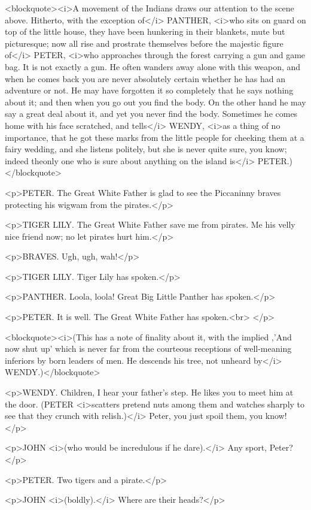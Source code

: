 <blockquote><i>A movement of the Indians draws our attention to the
scene above. Hitherto, with the exception of</i> PANTHER, <i>who sits
on guard on top of the little house, they have been hunkering in
their blankets, mute but picturesque; now all rise and prostrate
themselves before the majestic figure of</i> PETER, <i>who approaches
through the forest carrying a gun and game bag. It is not exactly a
gun. He often wanders away alone with this weapon, and when he comes
back you are never absolutely certain whether he has had an adventure
or not. He may have forgotten it so completely that he says nothing
about it; and then when you go out you find the body. On the other
hand he may say a great deal about it, and yet you never find the
body. Sometimes he comes home with his face scratched, and tells</i>
WENDY, <i>as a thing of no importance, that he got these marks from
the little people for cheeking them at a fairy wedding, and she
listens politely, but she is never quite sure, you know; indeed
theonly one who is sure about anything on the island is</i>
PETER.)</blockquote>

<p>PETER. The Great White Father is glad to see the Piccaninny braves
protecting his wigwam from the pirates.</p>

<p>TIGER LILY. The Great White Father save me from pirates. Me his
velly nice friend now; no let pirates hurt him.</p>

<p>BRAVES. Ugh, ugh, wah!</p>

<p>TIGER LILY. Tiger Lily has spoken.</p>

<p>PANTHER. Loola, loola! Great Big Little Panther has spoken.</p>

<p>PETER. It is well. The Great White Father has spoken.<br>
</p>

<blockquote><i>(This has a note of finality about it, with the
implied ,'And now shut up' which is never far from the courteous
receptions of well-meaning inferiors by born leaders of men. He
descends his tree, not unheard by</i> WENDY.)</blockquote>

<p>WENDY. Children, I hear your father's step. He likes you to meet
him at the door. (PETER <i>scatters pretend nuts among them and
watches sharply to see that they crunch with relish.)</i> Peter, you
just spoil them, you know!</p>

<p>JOHN <i>(who would be incredulous if he dare).</i> Any sport,
Peter?</p>

<p>PETER. Two tigers and a pirate.</p>

<p>JOHN <i>(boldly).</i> Where are their heads?</p>

